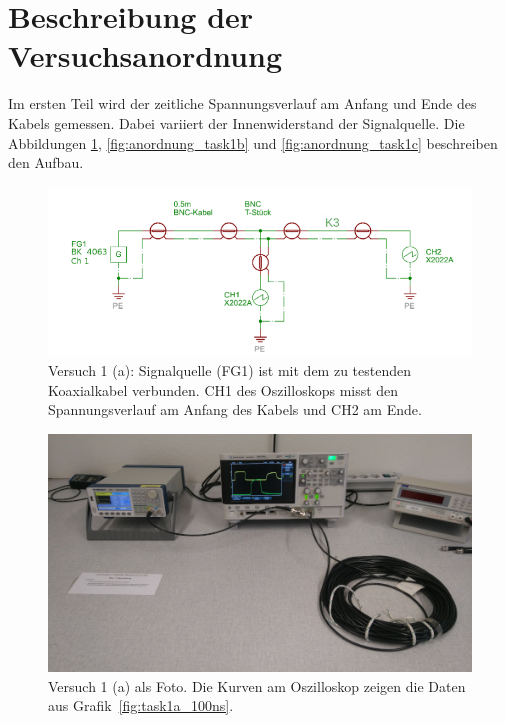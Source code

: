 \documentclass{article}
\begin{document}
\section{Beschreibung der Versuchsanordnung}

Im ersten Teil wird der zeitliche Spannungsverlauf am Anfang und Ende des Kabels gemessen. Dabei variiert der Innenwiderstand der Signalquelle. Die Abbildungen \ref{fig:anordnung_task1a}, \ref{fig:anordnung_task1b} und \ref{fig:anordnung_task1c} beschreiben den Aufbau.


\begin{figure}[H]
\centering
\caption{Versuch 1 (a): Signalquelle (FG1) ist mit dem zu testenden Koaxialkabel verbunden. CH1 des Oszilloskops misst den Spannungsverlauf am Anfang des Kabels und CH2 am Ende.}
\label{fig:anordnung_task1a}
\includegraphics[scale=1.6]{task1a.png}
\end{figure}


\begin{figure}[H]
\centering
\caption{Versuch 1 (a) als Foto. Die Kurven am Oszilloskop zeigen die Daten aus Grafik~\ref{fig:task1a_100ns}.}
\label{fig:foto_task1a}
\includegraphics[scale=0.6]{foto_task1a.jpg}
\end{figure}
\end{document}
